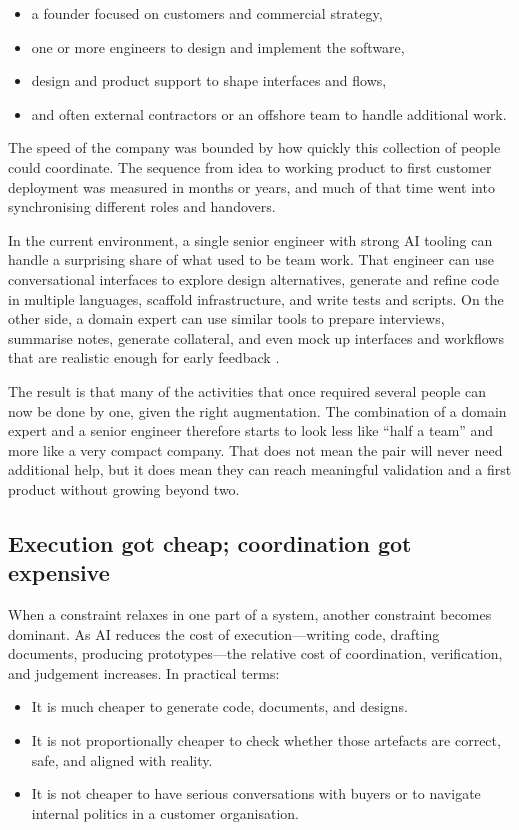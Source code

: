 \documentclass[10pt, a4paper, twocolumn]{article} %
\begin{document}
\begin{itemize}
  \item a founder focused on customers and commercial strategy,
  \item one or more engineers to design and implement the software,
  \item design and product support to shape interfaces and flows,
  \item and often external contractors or an offshore team to handle additional work.
\end{itemize}

The speed of the company was bounded by how quickly this collection of people could coordinate. The sequence from idea to working product to first customer deployment was measured in months or years, and much of that time went into synchronising different roles and handovers.

In the current environment, a single senior engineer with strong AI tooling can handle a surprising share of what used to be team work. That engineer can use conversational interfaces to explore design alternatives, generate and refine code in multiple languages, scaffold infrastructure, and write tests and scripts. On the other side, a domain expert can use similar tools to prepare interviews, summarise notes, generate collateral, and even mock up interfaces and workflows that are realistic enough for early feedback \citep{forsgren2018accelerate,blomgren2025coordination}.

The result is that many of the activities that once required several people can now be done by one, given the right augmentation. The combination of a domain expert and a senior engineer therefore starts to look less like “half a team” and more like a very compact company. That does not mean the pair will never need additional help, but it does mean they can reach meaningful validation and a first product without growing beyond two.

\subsection{Execution got cheap; coordination got expensive}

When a constraint relaxes in one part of a system, another constraint becomes dominant. As AI reduces the cost of execution—writing code, drafting documents, producing prototypes—the relative cost of coordination, verification, and judgement increases. In practical terms:

\begin{itemize}
  \item It is much cheaper to generate code, documents, and designs.
  \item It is not proportionally cheaper to check whether those artefacts are correct, safe, and aligned with reality.
  \item It is not cheaper to have serious conversations with buyers or to navigate internal politics in a customer organisation.
\end{itemize}
\end{document}

